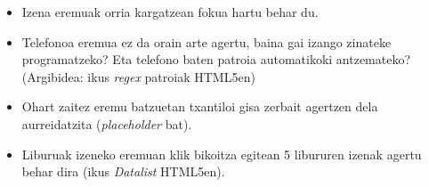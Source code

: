 \begin{itemize}
    \item Izena eremuak orria kargatzean fokua hartu behar du.

\item Telefonoa eremua ez da orain arte agertu, baina gai
izango zinateke programatzeko? Eta telefono baten
patroia automatikoki antzemateko? (Argibidea: ikus \textit{regex} patroiak
HTML5en)

\item Ohart zaitez eremu batzuetan txantiloi gisa zerbait agertzen dela aurreidatzita (\textit{placeholder} bat).

\item Liburuak izeneko eremuan klik bikoitza egitean 5 libururen izenak agertu behar dira (ikus \textit{Datalist} HTML5en).
\end{itemize} 